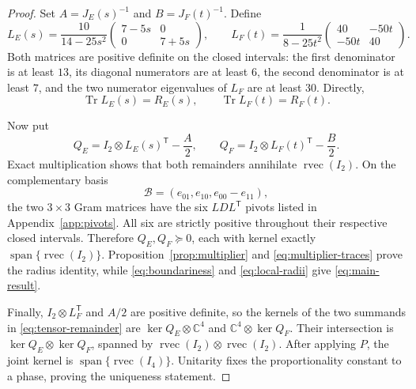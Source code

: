 \documentclass[11pt,a4paper]{article}
\theoremstyle{remark}
\DeclareMathOperator{\Tr}{Tr}
\DeclareMathOperator{\rvec}{rvec}
\newcommand{\I}{I}
\newcommand{\succeqz}{\succeq 0}
\begin{document}
\begin{proof}
Set $A=J_E(s)^{-1}$ and $B=J_F(t)^{-1}$.  Define
\begin{equation}
 L_E(s)=\frac{10}{14-25s^2}
 \begin{pmatrix}7-5s&0\\0&7+5s\end{pmatrix},\qquad
 L_F(t)=\frac{1}{8-25t^2}
 \begin{pmatrix}40&-50t\\-50t&40\end{pmatrix}.
 \label{eq:multipliers}
\end{equation}
Both matrices are positive definite on the closed intervals: the first
denominator is at least $13$, its diagonal numerators are at least $6$, the
second denominator is at least $7$, and the two numerator eigenvalues of
$L_F$ are at least $30$.  Directly,
\begin{equation}
 \Tr L_E(s)=R_E(s),\qquad \Tr L_F(t)=R_F(t).
 \label{eq:multiplier-traces}
\end{equation}

Now put
\begin{equation}
 Q_E=\I_2\otimes L_E(s)^{\mathsf T}-\frac{A}{2},\qquad
 Q_F=\I_2\otimes L_F(t)^{\mathsf T}-\frac{B}{2}.
 \label{eq:local-remainders}
\end{equation}
Exact multiplication shows that both remainders annihilate
$\rvec(\I_2)$.  On the complementary basis
\begin{equation}
 \mathcal B=(e_{01},e_{10},e_{00}-e_{11}),
 \label{eq:complement-basis}
\end{equation}
the two $3\times3$ Gram matrices have the six
$LDL^{\mathsf T}$ pivots listed in Appendix~\ref{app:pivots}.  All six are
strictly positive throughout their respective closed intervals.  Therefore
$Q_E,Q_F\succeqz$, each with kernel exactly
$\operatorname{span}\{\rvec(\I_2)\}$.  Proposition~\ref{prop:multiplier}
and \eqref{eq:multiplier-traces} prove the radius identity, while
\eqref{eq:boundariness} and \eqref{eq:local-radii} give
\eqref{eq:main-result}.

Finally, $\I_2\otimes L_F^{\mathsf T}$ and $A/2$ are positive definite, so
the kernels of the two summands in \eqref{eq:tensor-remainder} are
$\ker Q_E\otimes\mathbb C^4$ and $\mathbb C^4\otimes\ker Q_F$.  Their
intersection is $\ker Q_E\otimes\ker Q_F$, spanned by
$\rvec(\I_2)\otimes\rvec(\I_2)$.  After applying $P$, the joint kernel is
$\operatorname{span}\{\rvec(\I_4)\}$.  Unitarity fixes the proportionality
constant to a phase, proving the uniqueness statement.
\end{proof}
\end{document}
